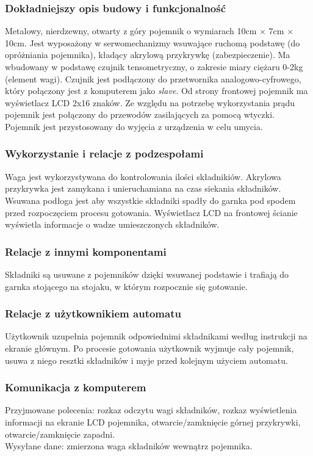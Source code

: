 \documentclass[12pt,a4paper,notitlepage]{report}
\begin{document}
\subsubsection{Dokładniejszy opis budowy i funkcjonalność}
Metalowy, nierdzewny, otwarty z góry pojemnik o wymiarach 10cm $\times$ 7cm $\times$ 10cm. Jest wyposażony w serwomechanizmy wsuwające ruchomą podstawę (do opróżniania pojemnika), kładący akrylową przykrywkę (zabezpieczenie). Ma wbudowany w podstawę czujnik tensometryczny, o zakresie miary ciężaru 0-2kg (element wagi). Czujnik jest podłączony do przetwornika analogowo-cyfrowego, który połączony jest z komputerem jako \emph{slave}. Od strony frontowej pojemnik ma wyświetlacz LCD 2x16 znaków. Ze względu na potrzebę wykorzystania prądu pojemnik jest połączony do przewodów zasilających za pomocą wtyczki. Pojemnik jest przystosowany do wyjęcia z urządzenia w celu umycia.
 
\subsubsection{Wykorzystanie i relacje z podzespołami}
Waga jest wykorzystywana do kontrolowania ilości składnikiów. Akrylowa przykrywka jest zamykana i unieruchamiana na czas siekania składników. Wsuwana podłoga jest aby wszystkie składniki spadły do garnka pod spodem przed rozpoczęciem procesu gotowania. Wyświetlacz LCD na frontowej ścianie wyświetla informacje o wadze umieszczonych składników.

\subsubsection{Relacje z innymi komponentami}
Składniki są usuwane z pojemników dzięki wsuwanej podstawie i trafiają do garnka stojącego na stojaku, w którym rozpocznie się gotowanie.

\subsubsection{Relacje z użytkownikiem automatu}
Użytkownik uzupełnia pojemnik odpowiednimi składnikami według instrukcji na ekranie głównym. Po procesie gotowania użytkownik wyjmuje cały pojemnik, usuwa z niego resztki składników i myje przed kolejnym użyciem automatu.

\subsubsection{Komunikacja z komputerem}
Przyjmowane polecenia: rozkaz odczytu wagi składników, rozkaz wyświetlenia informacji na ekranie LCD pojemnika, otwarcie/zamknięcie górnej przykrywki, otwarcie/zamknięcie zapadni.\\
Wysyłane dane: zmierzona waga składników wewnątrz pojemnika.
\end{document}
